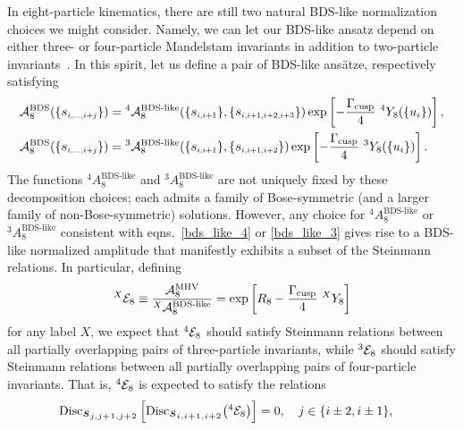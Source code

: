 \documentclass[11pt]{article}
\def\mand#1{\scaleto{s}{4.6pt}_{\scaleto{#1}{5.2pt}}}
\begin{document}
In eight-particle kinematics, there are still two natural BDS-like normalization choices we might consider. Namely, we can let our BDS-like ansatz depend on either three- or four-particle Mandelstam invariants in addition to two-particle invariants~\cite{Dixon:2016nkn}. In this spirit, let us define a pair of BDS-like ans\"atze, respectively satisfying
\begin{align}
{\cal A}_8^{\text{BDS}}(\{\mand{i,\dots,i+j}\}) &= {}^4 {\cal A}_8^{\text{BDS-like}}(\{\mand{i,i+1}\}, \{\mand{i,i+1,i+2,i+3}\}) \exp \left[ -\frac{\Gamma_{\text{cusp}}}{4}\ {}^4 Y_{8}(\{u_i\})  \right], \label{bds_like_4} \\
{\cal A}_8^{\text{BDS}}(\{\mand{i,\dots,i+j}\}) &= {}^3 {\cal A}_8^{\text{BDS-like}}(\{\mand{i,i+1}\}, \{\mand{i,i+1,i+2}\}) \exp \left[ - \frac{\Gamma_{\text{cusp}}}{4}\ {}^3 Y_{8}(\{u_i\})  \right]. \label{bds_like_3}
\end{align}
The functions ${}^4 A^{\text{BDS-like}}_{8}$ and ${}^3 A^{\text{BDS-like}}_{8}$ are not uniquely fixed by these decomposition choices; each admits a family of Bose-symmetric (and a larger family of non-Bose-symmetric) solutions. However, any choice for ${}^4 A^{\text{BDS-like}}_{8}$ or ${}^3 A^{\text{BDS-like}}_{8}$ consistent with eqns.~\eqref{bds_like_4} or \eqref{bds_like_3} gives rise to a BDS-like normalized amplitude that manifestly exhibits a subset of the Steinmann relations. In particular, defining
\begin{equation}
{}^X {\cal E}_8 \equiv \frac{{\cal A}_8^{\text{MHV}}}{{}^X {\cal A}^{\text{BDS-like}}_{8}} = \exp\left[ R_8 - \frac{\Gamma_{\text{cusp}}}{4} \  {}^X Y_8 \right] \label{BDS_like_amplitude}
\end{equation}
for any label $X$, we expect that ${}^4 {\cal E}_8$ should satisfy Steinmann relations between all partially overlapping pairs of three-particle invariants, while ${}^3 {\cal E}_8$ should satisfy Steinmann relations between all partially overlapping pairs of four-particle invariants. That is, ${}^4 {\cal E}_8$ is expected to satisfy the relations
\begin{equation}
\begin{split}
\text{Disc}_{\mand{j,j+1,j+2}}\left[\text{Disc}_{\mand{i,i+1,i+2}} \big({}^4 {\cal E}_8 \big) \right] &= 0, \quad  j \in \{ i \pm 2, i \pm 1 \}, \label{stein33}
\end{split}
\end{equation}
\end{document}
